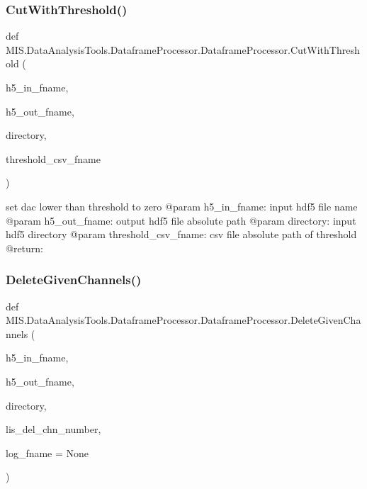 \subsubsection{\texorpdfstring{Cut\+With\+Threshold()}{CutWithThreshold()}}
{\footnotesize\ttfamily def M\+I\+S.\+Data\+Analysis\+Tools.\+Dataframe\+Processor.\+Dataframe\+Processor.\+Cut\+With\+Threshold (\begin{DoxyParamCaption}\item[{}]{h5\+\_\+in\+\_\+fname,  }\item[{}]{h5\+\_\+out\+\_\+fname,  }\item[{}]{directory,  }\item[{}]{threshold\+\_\+csv\+\_\+fname }\end{DoxyParamCaption})\hspace{0.3cm}{\ttfamily [static]}}

\begin{DoxyVerb}set dac lower than threshold to zero
@param h5_in_fname: input hdf5 file name
@param h5_out_fname: output hdf5 file absolute path
@param directory: input hdf5 directory
@param threshold_csv_fname: csv file absolute path of threshold
@return:
\end{DoxyVerb}
 \mbox{\label{classMIS_1_1DataAnalysisTools_1_1DataframeProcessor_1_1DataframeProcessor_a9ffa2dca6e4987e3d2081429ad33edaa}} 
\subsubsection{\texorpdfstring{Delete\+Given\+Channels()}{DeleteGivenChannels()}}
{\footnotesize\ttfamily def M\+I\+S.\+Data\+Analysis\+Tools.\+Dataframe\+Processor.\+Dataframe\+Processor.\+Delete\+Given\+Channels (\begin{DoxyParamCaption}\item[{}]{h5\+\_\+in\+\_\+fname,  }\item[{}]{h5\+\_\+out\+\_\+fname,  }\item[{}]{directory,  }\item[{}]{lis\+\_\+del\+\_\+chn\+\_\+number,  }\item[{}]{log\+\_\+fname = {\ttfamily None} }\end{DoxyParamCaption})\hspace{0.3cm}{\ttfamily [static]}}

